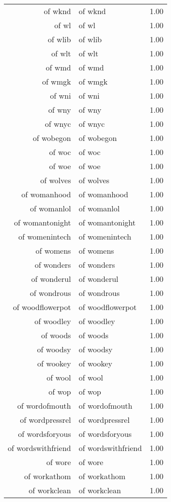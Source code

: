 \begin{table}[ht]
\begin{tabular}{rlr}
  of wknd & of wknd & 1.00 \\ 
  of wl & of wl & 1.00 \\ 
  of wlib & of wlib & 1.00 \\ 
  of wlt & of wlt & 1.00 \\ 
  of wmd & of wmd & 1.00 \\ 
  of wmgk & of wmgk & 1.00 \\ 
  of wni & of wni & 1.00 \\ 
  of wny & of wny & 1.00 \\ 
  of wnyc & of wnyc & 1.00 \\ 
  of wobegon & of wobegon & 1.00 \\ 
  of woc & of woc & 1.00 \\ 
  of woe & of woe & 1.00 \\ 
  of wolves & of wolves & 1.00 \\ 
  of womanhood & of womanhood & 1.00 \\ 
  of womanlol & of womanlol & 1.00 \\ 
  of womantonight & of womantonight & 1.00 \\ 
  of womenintech & of womenintech & 1.00 \\ 
  of womens & of womens & 1.00 \\ 
  of wonders & of wonders & 1.00 \\ 
  of wonderul & of wonderul & 1.00 \\ 
  of wondrous & of wondrous & 1.00 \\ 
  of woodflowerpot & of woodflowerpot & 1.00 \\ 
  of woodley & of woodley & 1.00 \\ 
  of woods & of woods & 1.00 \\ 
  of woodsy & of woodsy & 1.00 \\ 
  of wookey & of wookey & 1.00 \\ 
  of wool & of wool & 1.00 \\ 
  of wop & of wop & 1.00 \\ 
  of wordofmouth & of wordofmouth & 1.00 \\ 
  of wordpressrel & of wordpressrel & 1.00 \\ 
  of wordsforyous & of wordsforyous & 1.00 \\ 
  of wordswithfriend & of wordswithfriend & 1.00 \\ 
  of wore & of wore & 1.00 \\ 
  of workathom & of workathom & 1.00 \\ 
  of workclean & of workclean & 1.00 \\ 

\end{tabular}
\end{table}
